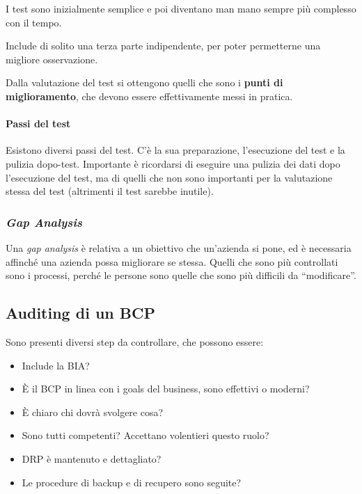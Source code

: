 
I test sono inizialmente semplice e poi diventano man mano sempre più complesso 
con il tempo.

Include di solito una terza parte indipendente, per poter permetterne una 
migliore osservazione.

Dalla valutazione del test si ottengono quelli che sono i \textbf{punti di 
miglioramento}, che devono essere effettivamente messi in pratica.

\paragraph*{Passi del test} Esistono diversi passi del test. C'è la sua 
preparazione, l'esecuzione del test e la pulizia dopo-test. Importante è 
ricordarsi di eseguire una pulizia dei dati dopo l'esecuzione del test, ma di 
quelli che non sono importanti per la valutazione stessa del test (altrimenti 
il test sarebbe inutile).

\subsubsection{\textit{Gap Analysis}}

Una \textit{gap analysis} è relativa a un obiettivo che un'azienda si pone, ed 
è necessaria affinché una azienda possa migliorare se stessa. Quelli che sono 
più controllati sono i processi, perché le persone sono quelle che sono più 
difficili da ``modificare''.

\subsection{Auditing di un BCP}

Sono presenti diversi step da controllare, che possono essere:
\begin{itemize}
  \item Include la BIA?
  \item È il BCP in linea con i goals del business, sono effettivi o moderni?
  \item È chiaro chi dovrà svolgere cosa?
  \item Sono tutti competenti? Accettano volentieri questo ruolo?
  \item DRP è mantenuto e dettagliato?
  \item Le procedure di backup e di recupero sono seguite?
\end{itemize}

